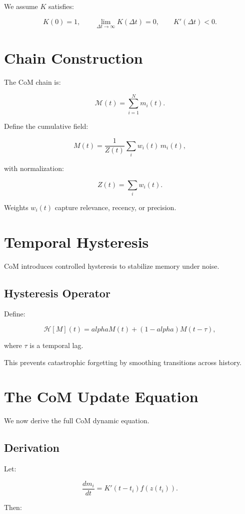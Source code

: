 \documentclass[12pt,oneside]{book}
\theoremstyle{plain}
\theoremstyle{definition}
\def\alpha{alpha}%
\begin{document}
We assume $K$ satisfies:

\[
K(0) = 1,
\qquad
\lim_{\Delta t \to \infty} K(\Delta t) = 0,
\qquad
K'(\Delta t) < 0.
\]

\section{Chain Construction}

The CoM chain is:

\[
\mathcal{M}(t) = \sum_{i=1}^N m_i(t).
\]

Define the cumulative field:

\[
M(t) = \frac{1}{Z(t)}\sum_i w_i(t)\, m_i(t),
\]

with normalization:

\[
Z(t) = \sum_i w_i(t).
\]

Weights $w_i(t)$ capture relevance, recency, or precision.

\section{Temporal Hysteresis}

CoM introduces controlled hysteresis to stabilize memory under noise.

\subsection{Hysteresis Operator}

Define:

\[
\mathcal{H}[M](t)
=
\alpha M(t)
+
(1-\alpha) M(t-\tau),
\]

where $\tau$ is a temporal lag.

This prevents catastrophic forgetting by smoothing transitions across history.

\section{The CoM Update Equation}

We now derive the full CoM dynamic equation.

\subsection{Derivation}

Let:

\[
\frac{d m_i}{dt}
=
K'(t - t_i)f(z(t_i)).
\]

Then:
\end{document}
